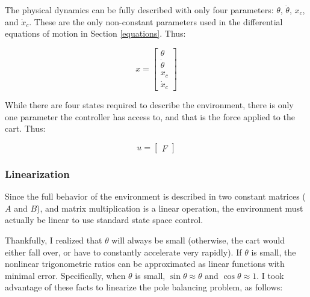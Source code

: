 \documentclass[12pt]{article}
\begin{document}
The physical dynamics can be fully described with only four parameters: $\theta$, $\dot \theta$, $x _c$, and $\dot x _c$. These are the only non-constant parameters used in the differential equations of motion in Section \ref{equations}. Thus:

\begin{equation}
    \displaystyle x = \begin{bmatrix}
        \theta \\
        \dot \theta \\
        x _c \\
        \dot x _c
    \end{bmatrix}
\end{equation}

While there are four states required to describe the environment, there is only one parameter the controller has access to, and that is the force applied to the cart. Thus:

\begin{equation}
    u = \begin{bmatrix}
        \displaystyle F
    \end{bmatrix}
\end{equation}

\subsubsection{Linearization}

Since the full behavior of the environment is described in two constant matrices ($A$ and $B$), and matrix multiplication is a linear operation, the environment must actually be linear to use standard state space control.

Thankfully, I realized that $\theta$ will always be small (otherwise, the cart would either fall over, or have to constantly accelerate very rapidly). If $\theta$ is small, the nonlinear trigonometric ratios can be approximated as linear functions with minimal error. Specifically, when $\theta$ is small, $\sin \theta \approx \theta$ and $\cos \theta \approx 1$. I took advantage of these facts to linearize the pole balancing problem, as follows:
\end{document}
